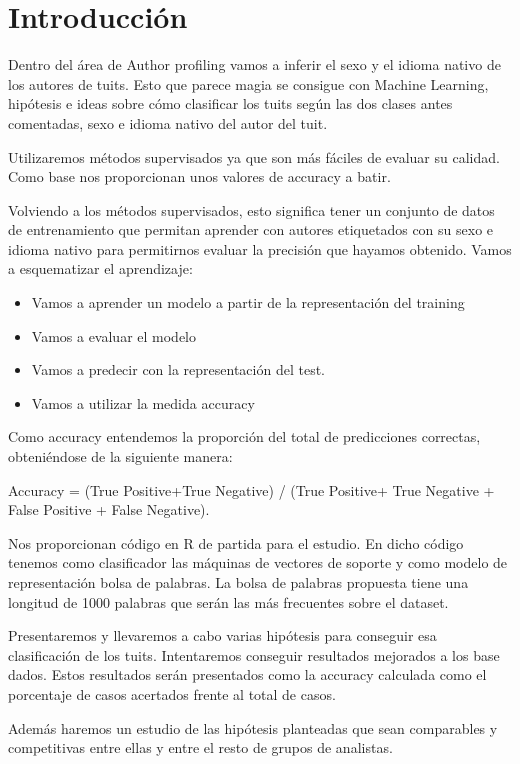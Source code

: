 \documentclass[11pt,a4paper]{article}
\begin{document}
\section{Introducción}
\justify
Dentro del \'area de Author profiling vamos a inferir el sexo y el idioma nativo de los autores de tuits. Esto que parece magia se consigue con Machine Learning, hip\'otesis e ideas sobre c\'omo clasificar los tuits según las dos clases antes comentadas, sexo e idioma nativo del autor del tuit. \par\noindent 
Utilizaremos m\'etodos supervisados ya que son m\'as f\'aciles de evaluar su calidad. Como base nos proporcionan unos valores de accuracy a batir. \par\noindent
Volviendo a los m\'etodos supervisados, esto significa tener un conjunto de datos de entrenamiento que permitan aprender con autores etiquetados con su sexo e idioma nativo para permitirnos evaluar la precisi\'on que hayamos obtenido. Vamos a esquematizar el aprendizaje: \par\noindent
\begin{itemize}
    \item Vamos a aprender un modelo a partir de la representaci\'on del training
    \item Vamos a evaluar el modelo
    \item Vamos a predecir con la representaci\'on del test.
    \item Vamos a utilizar la medida accuracy 
\end{itemize}
Como accuracy entendemos la proporci\'on del total de predicciones correctas, obteni\'endose de la siguiente manera:\par\noindent
Accuracy = (True Positive+True Negative) / (True Positive+ True Negative + False Positive + False Negative).\par\noindent
Nos proporcionan c\'odigo en R de partida para el estudio. En dicho c\'odigo tenemos como clasificador las m\'aquinas de vectores de soporte y como modelo de representaci\'on bolsa de palabras. La bolsa de palabras propuesta tiene una longitud de 1000 palabras que ser\'an las m\'as frecuentes sobre el dataset.\par\noindent
Presentaremos y llevaremos a cabo varias hip\'otesis para conseguir esa clasificaci\'on de los tuits. Intentaremos conseguir resultados mejorados a los base dados. Estos resultados ser\'an presentados como la accuracy calculada como el porcentaje de casos acertados frente al total de casos.\par\noindent
Adem\'as haremos un estudio de las hip\'otesis planteadas que sean comparables y competitivas entre ellas y entre el resto de grupos de analistas. 
\end{document}
